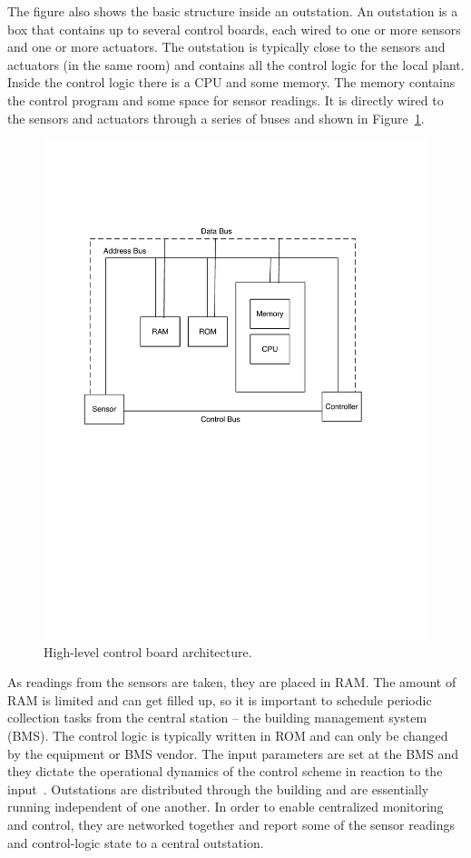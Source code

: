 The figure also shows the basic structure inside an outstation.  An outstation is a box that contains up to several control boards, each
wired to one or more sensors and one or more actuators.  The outstation is typically close to the sensors and actuators (in the same room)
and contains all the control logic for the local plant.  Inside the control logic there is a CPU and some memory.  The memory
contains the control program and some space for sensor readings.  It is directly wired to the sensors and actuators through
a series of buses and shown in Figure~\ref{fig:control_box}.

\begin{figure}[t!] %
\centering
\includegraphics[width=0.50\columnwidth]{figs/control_box}
\caption{High-level control board architecture.}
\label{fig:control_box}
\end{figure}

As readings from the sensors are taken, they are placed in RAM.  The amount of RAM is limited and can get filled up, so it is important
to schedule periodic collection tasks from the central station -- the building management system (BMS).  The control logic is typically
written in ROM and can only be changed by the equipment or BMS vendor.  The input parameters are set at the BMS and they dictate the operational dynamics
of the control scheme in reaction to the input~\cite{BMS_book}.
Outstations are distributed through the building and are essentially running independent of one another.  In order to enable centralized 
monitoring and control, they are networked together and report some of the sensor readings and control-logic state to a central outstation.

